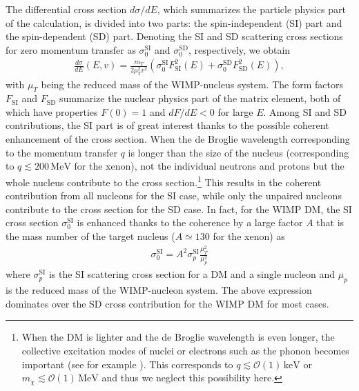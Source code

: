 \documentclass[12pt,twoside,book]{article}
\begin{document}
The differential cross section $d\sigma / dE$, which summarizes the particle physics part of the calculation, is divided into two parts: the spin-independent (SI) part and the spin-dependent (SD) part.
Denoting the SI and SD scattering cross sections for zero momentum transfer as $\sigma_0^{\mathrm{SI}}$ and $\sigma_0^{\mathrm{SD}}$, respectively, we obtain
\begin{align}
  \frac{d\sigma}{d E} (E, v) = \frac{m_T}{2 \mu_T^2 v^2}
  \left( \sigma_0^{\mathrm{SI}} F_{\mathrm{SI}}^2 (E)
  + \sigma_0^{\mathrm{SD}} F_{\mathrm{SD}}^2 (E) \right),
\end{align}
with $\mu_T$ being the reduced mass of the WIMP-nucleus system.
The form factors $F_{\mathrm{SI}}$ and $F_{\mathrm{SD}}$ summarize the nuclear physics part of the matrix element, both of which have properties $F(0)=1$ and $dF / dE < 0$ for large $E$.
Among SI and SD contributions, the SI part is of great interest thanks to the possible coherent enhancement of the cross section.
When the de Broglie wavelength corresponding to the momentum transfer $q$ is longer than the size of the nucleus (corresponding to $q \lesssim 200\,\mathrm{MeV}$ for the xenon), not the individual neutrons and protons but the whole nucleus contribute to the cross section.\footnote{
  When the DM is lighter and the de Broglie wavelength is even longer, the collective excitation modes of nuclei or electrons such as the phonon becomes important (see for example \cite{Knapen:2017xzo}).
  This corresponds to $q \lesssim \mathcal{O}(1)\,\mathrm{keV}$ or $m_\chi \lesssim \mathcal{O}(1)\,\mathrm{MeV}$ and thus we neglect this possibility here.
}
This results in the coherent contribution from all nucleons for the SI case, while only the unpaired nucleons contribute to the cross section for the SD case.
In fact, for the WIMP DM, the SI cross section $\sigma_0^{\mathrm{SI}}$ is enhanced thanks to the coherence by a large factor $A$ that is the mass number of the target nucleus ($A \simeq 130$ for the xenon) as
\begin{align}
  \sigma_0^{\mathrm{SI}} = A^2 \sigma_p^{\mathrm{SI}} \frac{\mu_T^2}{\mu_p^2}
\end{align}
where $\sigma_p^{\mathrm{SI}}$ is the SI scattering cross section for a DM and a single nucleon and $\mu_p$ is the reduced mass of the WIMP-nucleon system.
The above expression dominates over the SD cross contribution for the WIMP DM for most cases.
\end{document}
